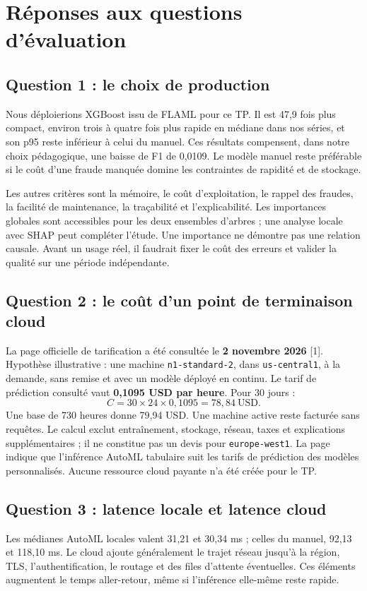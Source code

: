 \documentclass[11pt,a4paper]{article}
\begin{document}
\clearpage
\section{Réponses aux questions d'évaluation}
\subsection*{Question 1 : le choix de production}
Nous déploierions XGBoost issu de FLAML pour ce TP. Il est 47,9 fois plus compact, environ trois à quatre fois plus rapide en médiane dans nos séries, et son p95 reste inférieur à celui du manuel. Ces résultats compensent, dans notre choix pédagogique, une baisse de F1 de 0,0109. Le modèle manuel reste préférable si le coût d'une fraude manquée domine les contraintes de rapidité et de stockage.

Les autres critères sont la mémoire, le coût d'exploitation, le rappel des fraudes, la facilité de maintenance, la traçabilité et l'explicabilité. Les importances globales sont accessibles pour les deux ensembles d'arbres ; une analyse locale avec SHAP peut compléter l'étude. Une importance ne démontre pas une relation causale. Avant un usage réel, il faudrait fixer le coût des erreurs et valider la qualité sur une période indépendante.

\subsection*{Question 2 : le coût d'un point de terminaison cloud}
La page officielle de tarification a été consultée le \textbf{2 novembre 2026} [1]. Hypothèse illustrative : une machine \texttt{n1-standard-2}, dans \texttt{us-central1}, à la demande, sans remise et avec un modèle déployé en continu. Le tarif de prédiction consulté vaut \textbf{0,1095 USD par heure}. Pour 30 jours :
\[
 C = 30 \times 24 \times 0{,}1095 = \boxed{78{,}84\ \text{USD}}.
\]
Une base de 730 heures donne 79,94 USD. Une machine active reste facturée sans requêtes. Le calcul exclut entraînement, stockage, réseau, taxes et explications supplémentaires ; il ne constitue pas un devis pour \texttt{europe-west1}. La page indique que l'inférence AutoML tabulaire suit les tarifs de prédiction des modèles personnalisés. Aucune ressource cloud payante n'a été créée pour le TP.

\subsection*{Question 3 : latence locale et latence cloud}
Les médianes AutoML locales valent 31,21 et 30,34 ms ; celles du manuel, 92,13 et 118,10 ms. Le cloud ajoute généralement le trajet réseau jusqu'à la région, TLS, l'authentification, le routage et des files d'attente éventuelles. Ces éléments augmentent le temps aller-retour, même si l'inférence elle-même reste rapide.
\end{document}
